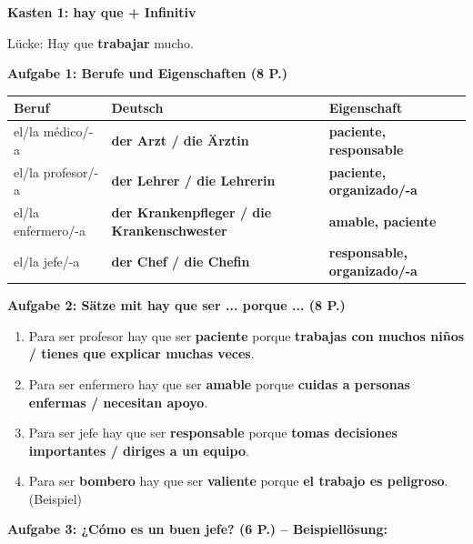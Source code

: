 \documentclass[11pt,a4paper]{article}
\newcommand{\lsg}[1]{\textcolor{loesung}{\textbf{#1}}}
\begin{document}
\begin{gruppeBbox}

\textbf{Kasten 1: hay que + Infinitiv}

Lücke: Hay que \lsg{trabajar} mucho.

\vspace{0.8em}

\textbf{Aufgabe 1: Berufe und Eigenschaften (8 P.)}

\begin{tabularx}{\textwidth}{@{}|X|X|X|@{}}
\hline
\textbf{Beruf} & \textbf{Deutsch} & \textbf{Eigenschaft} \\
\hline
el/la médico/-a & \lsg{der Arzt / die Ärztin} & \lsg{paciente, responsable} \\
\hline
el/la profesor/-a & \lsg{der Lehrer / die Lehrerin} & \lsg{paciente, organizado/-a} \\
\hline
el/la enfermero/-a & \lsg{der Krankenpfleger / die Krankenschwester} & \lsg{amable, paciente} \\
\hline
el/la jefe/-a & \lsg{der Chef / die Chefin} & \lsg{responsable, organizado/-a} \\
\hline
\end{tabularx}

\vspace{0.5em}
\textbf{Aufgabe 2: Sätze mit hay que ser ... porque ... (8 P.)}

\begin{enumerate}[label=\alph*), leftmargin=2em, nosep]
    \item Para ser profesor hay que ser \lsg{paciente} porque \lsg{trabajas con muchos niños / tienes que explicar muchas veces}.
    \item Para ser enfermero hay que ser \lsg{amable} porque \lsg{cuidas a personas enfermas / necesitan apoyo}.
    \item Para ser jefe hay que ser \lsg{responsable} porque \lsg{tomas decisiones importantes / diriges a un equipo}.
    \item Para ser \lsg{bombero} hay que ser \lsg{valiente} porque \lsg{el trabajo es peligroso}. (Beispiel)
\end{enumerate}

\vspace{0.5em}
\textbf{Aufgabe 3: ¿Cómo es un buen jefe? (6 P.) -- Beispiellösung:}


\end{gruppeBbox}
\end{document}

